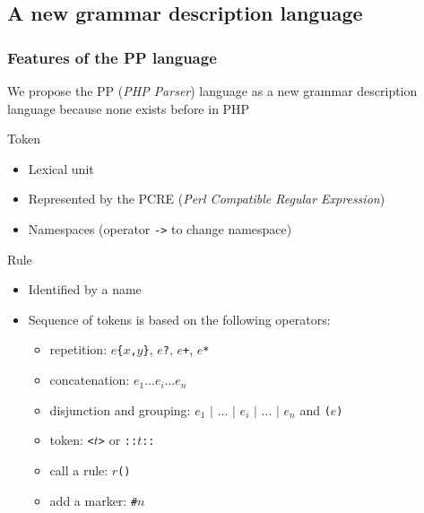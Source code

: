 \documentclass[9pt]{beamer}
\newcommand{\code}[1]{\texttt{#1}}
\newcommand{\outlinereminder}[0]{
  \frame{\frametitle{Outline}
  \tableofcontents[currentsection,subsectionstyle=show/show/hide]}
}
\begin{document}
\outlinereminder

\subsection{A new grammar description language}

\begin{frame}
\frametitle{Features of the PP language}

We propose the PP ({\em PHP Parser}) language as a new grammar description
language because none exists before in PHP

\begin{block}{Token}
\begin{itemize}
\item Lexical unit
\item Represented by the PCRE ({\em Perl Compatible Regular Expression})
\item Namespaces (operator \code{->} to change namespace)
\end{itemize}
\end{block}

\begin{block}{Rule}
\begin{itemize}
\item Identified by a name
\item Sequence of tokens is based on the following operators:
  \begin{itemize}
  \item repetition: $e$\code{\{}$x$\code{,}$y$\code{\}}, $e$\code{?},
  $e$\code{+}, $e$\code{*}
  \item concatenation: $e_1 \dots e_i \dots e_n$
  \item disjunction and grouping: $e_1$ \code{$\vert$} $\dots$ \code{$\vert$}
  $e_i$ \code{$\vert$} $\dots$ \code{$\vert$} $e_n$ and \code{(}$e$\code{)}
  \item token: \code{<}$t$\code{>} or \code{::}$t$\code{::}
  \item call a rule: $r$\code{()}
  \item add a marker: \code{\#}$n$
  \end{itemize}
\end{itemize}
\end{block}

\end{frame}
\end{document}
